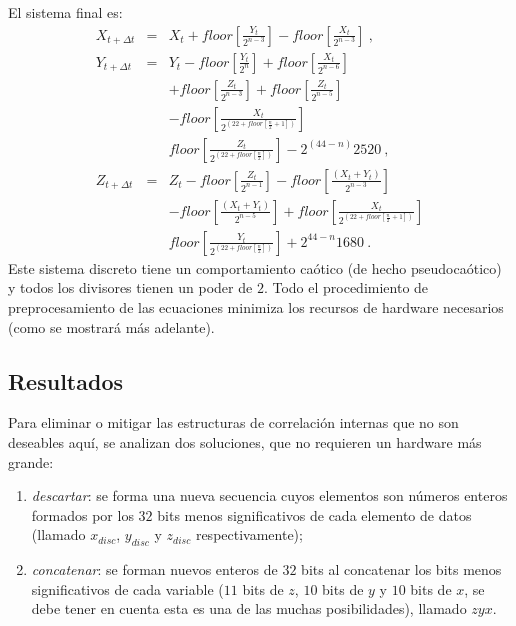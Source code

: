 El sistema final es:
%
\begin{eqnarray}\label{eq:Lorenz3}
{X}_{t+\Delta t}&=&{X}_{t}+floor\left[ {\frac{{Y}_{t}}{2^{{n-3}}}}
\right] -floor\left[{\frac{{X}_{t}}{2^{{n-3}}}}\right] \ , \nonumber \\
{Y}_{t+\Delta t}&=&{Y}_{t}-floor\left[
{\frac{{Y}_{t}}{2^n}}\right]
+floor\left[{\frac{{X}_{t}}{2^{{n-6}}}}\right]\nonumber \\
&& +floor\left[ {\frac{{Z}_{t}}{2^{{n-3}}}}\right] +
floor\left[{\frac{{Z}_{t}}{2^{{n-5}}}}\right]\nonumber \\
&&-floor\left[ {\frac{{X}_{t}}{2^{( 22+floor\left[
			{\frac{n}{2}+1}\right] )}
	}}\right] \nonumber \\
	&& floor\left[ {\frac{{Z}_{t}}{2^{( 22+floor\left[
				{\frac{n}{2}}\right] )}}}\right] -2^{(44-n)}2520 \ , \\
	{Z}_{t+\Delta t}&=&{Z}_{t}-floor\left[
	{\frac{{Z}_{t}}{2^{n-1}}}\right] -floor\left[
	{\frac{({X}_{t}+{Y}_{t})}{2^{n-3}}}\right]\nonumber \\
	&& -floor\left[ {\frac{({X}_{t}+{Y}_{t})}{2^{n-5}}}\right]
	+floor\left[ {\frac{{X}_{t}}{2^{( 22+floor\left[
				{\frac{n}{2}+1}\right]
				)}}}\right] \nonumber \\
	&& floor\left[ {\frac{{Y}_{t}}{2^{( 22+floor\left[
				{\frac{n}{2}}\right] )}}}\right]+2^{44-n}1680 \ . \nonumber
\end{eqnarray}
%
Este sistema discreto tiene un comportamiento caótico (de hecho pseudocaótico) y todos los divisores tienen un poder de $2$.
Todo el procedimiento de preprocesamiento de las ecuaciones minimiza los recursos de hardware necesarios (como se mostrará más adelante).

\subsection{Resultados}

Para eliminar o mitigar las estructuras de correlación internas que no son deseables aquí, se analizan dos soluciones, que no requieren un hardware más grande:
\begin{enumerate}
\item \textit{descartar}: se forma una nueva secuencia cuyos elementos son números enteros formados por los $32$ bits menos significativos de cada elemento de datos (llamado $x_{disc}$, $y_{disc}$ y $z_{disc}$ respectivamente);
\item \textit{concatenar}: se forman nuevos enteros de $32$ bits al concatenar los bits menos significativos de cada variable ($11$ bits de $z$, $10$ bits de $y$ y $10$ bits de $x$, se debe tener en cuenta esta es una de las muchas posibilidades), llamado $zyx$.
\end{enumerate}

